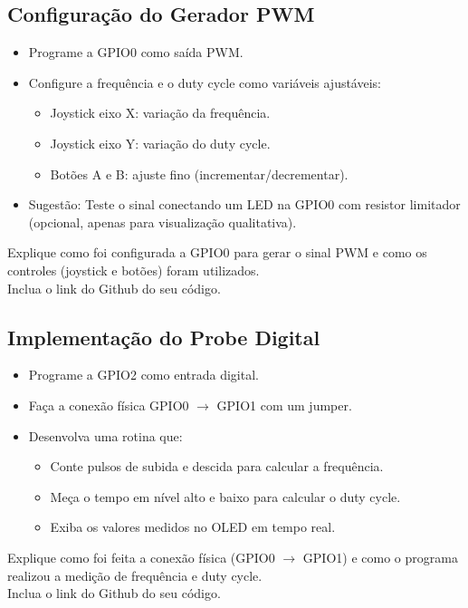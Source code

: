\documentclass{article}
\begin{document}
\subsection{Configuração do Gerador PWM}
\begin{itemize}
    \item Programe a GPIO0 como saída PWM.
    \item Configure a frequência e o duty cycle como variáveis ajustáveis:
    \begin{itemize}
        \item Joystick eixo X: variação da frequência.
        \item Joystick eixo Y: variação do duty cycle.
        \item Botões A e B: ajuste fino (incrementar/decrementar).
    \end{itemize}
    \item Sugestão: Teste o sinal conectando um LED na GPIO0 com resistor limitador (opcional, apenas para visualização qualitativa).
\end{itemize}
Explique como foi configurada a GPIO0 para gerar o sinal PWM e como os controles (joystick e botões) foram utilizados. \\
Inclua o link do Github do seu código. 

\subsection{Implementação do Probe Digital}
\begin{itemize}
    \item Programe a GPIO2 como entrada digital.
    \item Faça a conexão física GPIO0 $\rightarrow$ GPIO1 com um jumper.
    \item Desenvolva uma rotina que:
    \begin{itemize}
        \item Conte pulsos de subida e descida para calcular a frequência.
        \item Meça o tempo em nível alto e baixo para calcular o duty cycle.
        \item Exiba os valores medidos no OLED em tempo real.
    \end{itemize}
\end{itemize}
Explique como foi feita a conexão física (GPIO0 $\rightarrow$ GPIO1) e como o programa realizou a medição de frequência e duty cycle. \\
Inclua o link do Github do seu código. 
\end{document}
